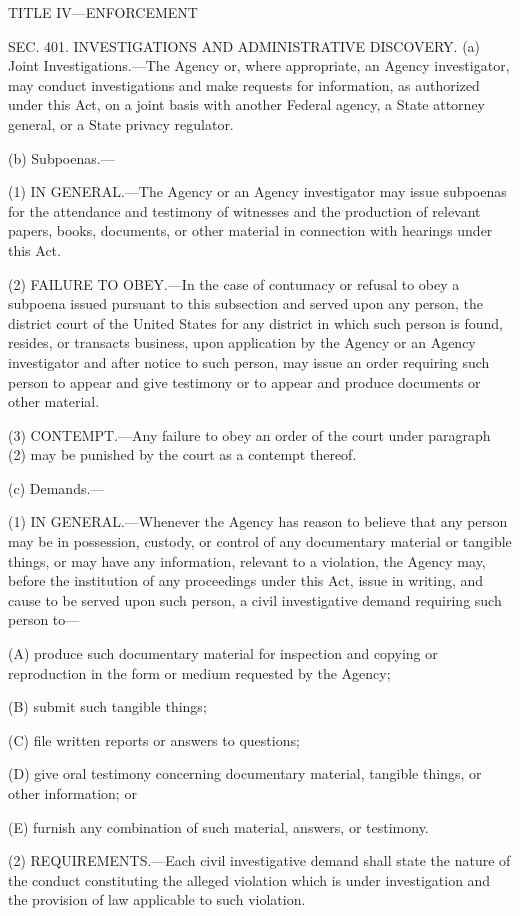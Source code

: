 TITLE IV—ENFORCEMENT

SEC. 401. INVESTIGATIONS AND ADMINISTRATIVE DISCOVERY.
(a) Joint Investigations.—The Agency or, where appropriate, an Agency investigator, may conduct investigations and make requests for information, as authorized under this Act, on a joint basis with another Federal agency, a State attorney general, or a State privacy regulator.

(b) Subpoenas.—

(1) IN GENERAL.—The Agency or an Agency investigator may issue subpoenas for the attendance and testimony of witnesses and the production of relevant papers, books, documents, or other material in connection with hearings under this Act.

(2) FAILURE TO OBEY.—In the case of contumacy or refusal to obey a subpoena issued pursuant to this subsection and served upon any person, the district court of the United States for any district in which such person is found, resides, or transacts business, upon application by the Agency or an Agency investigator and after notice to such person, may issue an order requiring such person to appear and give testimony or to appear and produce documents or other material.

(3) CONTEMPT.—Any failure to obey an order of the court under paragraph (2) may be punished by the court as a contempt thereof.

(c) Demands.—

(1) IN GENERAL.—Whenever the Agency has reason to believe that any person may be in possession, custody, or control of any documentary material or tangible things, or may have any information, relevant to a violation, the Agency may, before the institution of any proceedings under this Act, issue in writing, and cause to be served upon such person, a civil investigative demand requiring such person to—

(A) produce such documentary material for inspection and copying or reproduction in the form or medium requested by the Agency;

(B) submit such tangible things;

(C) file written reports or answers to questions;

(D) give oral testimony concerning documentary material, tangible things, or other information; or

(E) furnish any combination of such material, answers, or testimony.

(2) REQUIREMENTS.—Each civil investigative demand shall state the nature of the conduct constituting the alleged violation which is under investigation and the provision of law applicable to such violation.

